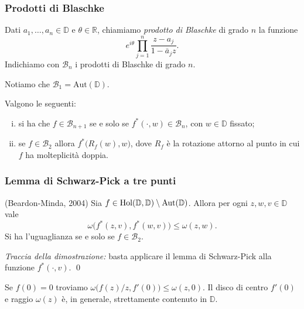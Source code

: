 \begin{frame}
  \frametitle{Prodotti di Blaschke}
  \begin{defn}
    Dati $a_1,\dots,a_n \in \mathbb{D}$ e $\theta \in \mathbb{R}$, chiamiamo \textit{prodotto di Blaschke} di grado $n$ la funzione
    $$e^{i\theta}\prod_{j=1}^n \frac{z-a_j}{1-\bar{a}_jz}.$$
    Indichiamo con $\mathcal{B}_n$ i prodotti di Blaschke di grado $n$.
  \end{defn}
  \pause
  Notiamo che $\mathcal{B}_1=\text{Aut}(\mathbb{D})$.
  \pause
  \begin{prop}
    Valgono le seguenti:
    \begin{enumerate}[(i)]
      \item si ha che $f \in \mathcal{B}_{n+1}$ se e solo se $f^*(\cdot,w) \in \mathcal{B}_n$, con $w \in \mathbb{D}$ fissato;
      \item se $f \in \mathcal{B}_2$ allora $f^*\bigl(R_f(w),w\bigr)$, dove $R_f$ è la rotazione attorno al punto in cui $f$ ha molteplicità doppia.
    \end{enumerate}
  \end{prop}
\end{frame}

\begin{frame}
  \frametitle{Lemma di Schwarz-Pick a tre punti}
  \begin{thm} \label{31}
    (Beardon-Minda, 2004) Sia $f \in \text{\normalfont{Hol}}(\mathbb{D},\mathbb{D})\setminus\text{\normalfont{Aut}}(\mathbb{D})$. Allora per ogni $z, w, v \in \mathbb{D}$ vale
    \begin{equation} \label{3.1}
      \omega\bigl(f^*(z,v),f^*(w,v)\bigr) \le \omega(z,w).
    \end{equation}
    Si ha l'uguaglianza se e solo se $f \in \mathcal{B}_2$.
  \end{thm}
  \pause
  \textit{Traccia della dimostrazione:} basta applicare il lemma di Schwarz-Pick alla funzione $f^*(\cdot,v)$. \qed
  \pause
  \begin{oss}
    Se $f(0)=0$ troviamo $\omega\bigl(f(z)/z,f'(0)\bigr) \le \omega(z,0)$. Il disco di centro $f'(0)$ e raggio $\omega(z)$ è, in generale, strettamente contenuto in $\mathbb{D}$.
  \end{oss}
\end{frame}

